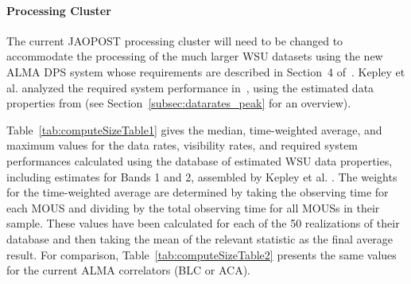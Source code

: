 
\paragraph{Processing Cluster} %
\label{par:processing_cluster}

The current JAOPOST processing cluster will need to be changed to accommodate the processing of the much larger WSU datasets using the new ALMA DPS system whose requirements are described in Section~4 of~\cite{dp}. Kepley et al. analyzed the required system performance in~\cite{dpSizeOfCompute}, using the estimated data properties from \cite{drru_mean} (see Section~\ref{subsec:datarates_peak} for an overview). 




Table~\ref{tab:computeSizeTable1} gives the median, time-weighted average, and maximum values for the data rates, visibility rates, and required system performances calculated using the database of estimated WSU data properties, including estimates for Bands 1 and 2, assembled by Kepley et al. \cite{dpSizeOfCompute}. The weights for the time-weighted average are determined by taking the observing time for each MOUS and dividing by the total observing time for all MOUSs in their sample. These values have been calculated for each of the 50 realizations of their database and then taking the mean of the relevant statistic as the final average result. For comparison, Table~\ref{tab:computeSizeTable2} presents the same values for the current ALMA correlators (BLC or ACA).



